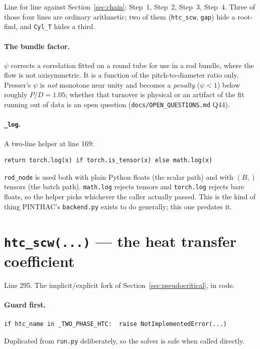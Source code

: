 \documentclass[11pt]{article}
\newcommand{\code}[1]{\texttt{#1}}
\begin{document}
Line for line against Section~\ref{sec:chain}: Step~1, Step~2, Step~3, Step~4. Three of
those four lines are ordinary arithmetic; two of them (\code{htc\_scw}, \code{gap}) hide
a root-find, and \code{Cyl\_T} hides a third.

\paragraph{The bundle factor.} $\psi$ corrects a correlation fitted on a round tube for
use in a rod bundle, where the flow is not axisymmetric. It is a function of the
pitch-to-diameter ratio only. Presser's $\psi$ is \emph{not} monotone near unity and
becomes a \emph{penalty} ($\psi < 1$) below roughly $P/D = 1.05$; whether that turnover
is physical or an artifact of the fit running out of data is an open question
(\code{docs/OPEN\_QUESTIONS.md} Q44).

\paragraph{\code{\_log}.} A two-line helper at line 169:
\begin{lstlisting}
return torch.log(x) if torch.is_tensor(x) else math.log(x)
\end{lstlisting}
\code{rod\_node} is used both with plain Python floats (the scalar path) and with $(B,)$
tensors (the batch path). \code{math.log} rejects tensors and \code{torch.log} rejects
bare floats, so the helper picks whichever the caller actually passed. This is the kind
of thing PINTHAC's \code{backend.py} exists to do generally; this one predates it.

\section{\code{htc\_scw(...)} --- the heat transfer coefficient}
Line 295. The implicit/explicit fork of Section~\ref{sec:pseudocritical}, in code.

\paragraph{Guard first.}
\begin{lstlisting}
if htc_name in _TWO_PHASE_HTC:  raise NotImplementedError(...)
\end{lstlisting}
Duplicated from \code{run.py} deliberately, so the solver is safe when called directly.
\end{document}
